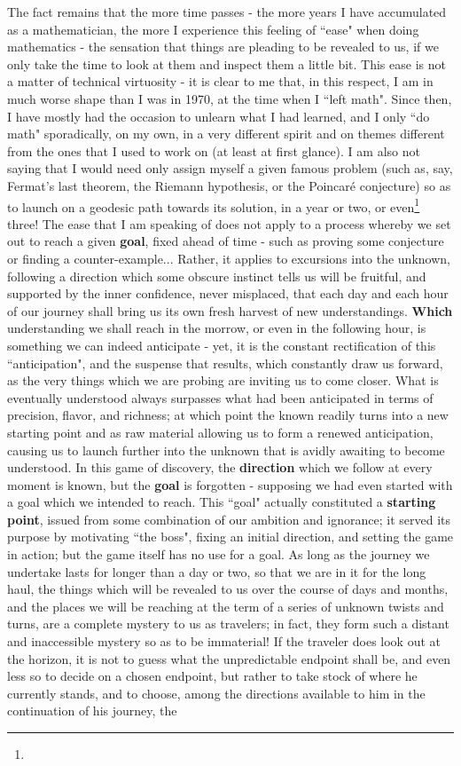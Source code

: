 The fact remains that the more time passes - the more years I have accumulated as a mathematician, the more I experience this feeling of ``ease" when doing mathematics - the sensation that things are pleading to be revealed to us, if we only take the time to look at them and inspect them a little bit. This ease is not a matter of technical virtuosity - it is clear to me that, in this respect, I am in much worse shape than I was in 1970, at the time when I ``left math". Since then, I have mostly had the occasion to unlearn what I had learned, and I only ``do math" sporadically, on my own, in a very different spirit and on themes different from the ones that I used to work on (at least at first glance). I am also not saying that I would need only assign myself a given famous problem (such as, say, Fermat's last theorem, the Riemann hypothesis, or the Poincar\'e conjecture) so as to launch on a geodesic path towards its solution, in a year or two, or even\footnote{} three! The ease that I am speaking of does not apply to a process whereby we set out to reach a given \textbf{goal}, fixed ahead of time - such as proving some conjecture or finding a counter-example... Rather, it applies to excursions into the unknown, following a direction which some obscure instinct tells us will be fruitful, and supported by the inner confidence, never misplaced, that each day and each hour of our journey shall bring us its own fresh harvest of new understandings. \textbf{Which} understanding we shall reach in the morrow, or even in the following hour, is something we can indeed anticipate - yet, it is the constant rectification of this ``anticipation", and the suspense that results, which constantly draw us forward, as the very things which we are probing are inviting us to come closer. What is eventually understood always surpasses what had been anticipated in terms of precision, flavor, and richness; at which point the known readily turns into a new starting point and as raw material allowing us to form a renewed anticipation, causing us to launch further into the unknown that is avidly awaiting to become understood. In this game of discovery, the \textbf{direction} which we follow at every moment is known, but the \textbf{goal} is forgotten - supposing we had even started with a goal which we intended to reach. This ``goal" actually constituted a \textbf{starting point}, issued from some combination of our ambition and ignorance; it served its purpose by motivating ``the boss", fixing an initial direction, and setting the game in action; but the game itself has no use for a goal. As long as the journey we undertake lasts for longer than a day or two, so that we are in it for the long haul, the things which will be revealed to us over the course of days and months, and the places we will be reaching at the term of a series of unknown twists and turns, are a complete mystery to us as travelers; in fact, they form such a distant and inaccessible mystery so as to be immaterial! If the traveler does look out at the horizon, it is not to guess what the unpredictable endpoint shall be, and even less so to decide on a chosen endpoint, but rather to take stock of where he currently stands, and to choose, among the directions available to him in the continuation of his journey, the 